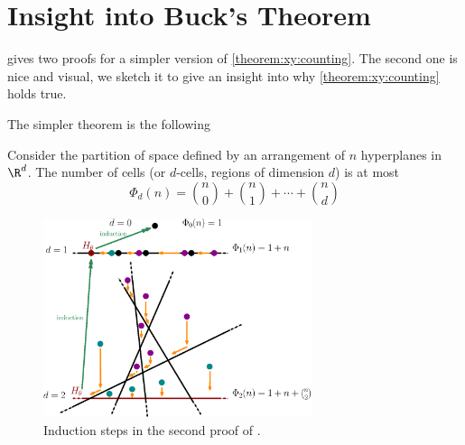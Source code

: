 \section{Insight into Buck's Theorem}

\citet*{matousek:2002} gives two proofs for a simpler version of
\ref{theorem:xy:counting}. The second one is nice and visual, we
sketch it to give an insight into why \ref{theorem:xy:counting} holds
true.

The simpler theorem is the following
\begin{theorem}
Consider the partition of space defined by an arrangement of \(n\) hyperplanes
in \(\R^d\). The number of cells (or \(d\)-cells, regions of dimension \(d\))
is at most
\begin{displaymath}
\Phi_d(n) = \binom{n}{0} + \binom{n}{1} + \cdots + \binom{n}{d}
\end{displaymath}
\end{theorem}

\begin{figure}
\centering
\includegraphics[width=0.7\textwidth,trim=-50 0 0 0]{fig/x+y/buck/arrangement}
\caption{Induction steps in the second proof of \citet*{matousek:2002}.}
\label{fig:xy:buck:arrangement}
\end{figure}

